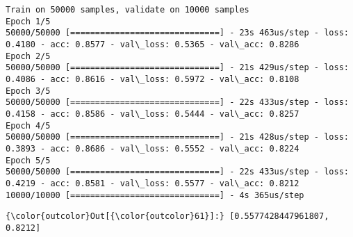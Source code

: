 \documentclass[11pt]{article}
\begin{document}
    \begin{Verbatim}[commandchars=\\\{\}]
Train on 50000 samples, validate on 10000 samples
Epoch 1/5
50000/50000 [==============================] - 23s 463us/step - loss: 0.4180 - acc: 0.8577 - val\_loss: 0.5365 - val\_acc: 0.8286
Epoch 2/5
50000/50000 [==============================] - 21s 429us/step - loss: 0.4086 - acc: 0.8616 - val\_loss: 0.5972 - val\_acc: 0.8108
Epoch 3/5
50000/50000 [==============================] - 22s 433us/step - loss: 0.4158 - acc: 0.8586 - val\_loss: 0.5444 - val\_acc: 0.8257
Epoch 4/5
50000/50000 [==============================] - 21s 428us/step - loss: 0.3893 - acc: 0.8686 - val\_loss: 0.5552 - val\_acc: 0.8224
Epoch 5/5
50000/50000 [==============================] - 22s 433us/step - loss: 0.4219 - acc: 0.8581 - val\_loss: 0.5577 - val\_acc: 0.8212
10000/10000 [==============================] - 4s 365us/step

    \end{Verbatim}

\begin{Verbatim}[commandchars=\\\{\}]
{\color{outcolor}Out[{\color{outcolor}61}]:} [0.5577428447961807, 0.8212]
\end{Verbatim}
            
\end{document}
